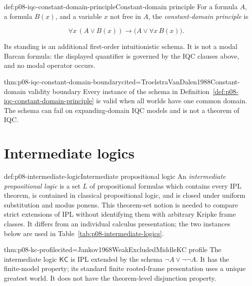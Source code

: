 \begin{hbdefinition}{def:p08-iqc-constant-domain-principle}{Constant-domain principle}
For a formula \(A\), a formula \(B(x)\), and a variable \(x\) not free in
\(A\), the \emph{constant-domain principle} is

\[
  \forall x\,(A\lor B(x))\to
  \bigl(A\lor\forall x\,B(x)\bigr).
\]

Its standing is an additional first-order intuitionistic schema.  It is not a
modal Barcan formula: the displayed quantifier is governed by the IQC clauses
above, and no modal operator occurs.
\end{hbdefinition}

\begin{hbtheorem}{thm:p08-iqc-constant-domain-boundary}{cited=TroelstraVanDalen1988}{Constant-domain validity boundary}
Every instance of the schema in
Definition~\ref{def:p08-iqc-constant-domain-principle} is valid when all
worlds have one common domain.  The schema can fail on expanding-domain IQC
models and is not a theorem of IQC.
\end{hbtheorem}

\section{Intermediate logics}

\begin{hbdefinition}{def:p08-intermediate-logic}{Intermediate propositional logic}
An \emph{intermediate propositional logic} is a set \(L\) of propositional
formulas which contains every IPL theorem, is contained in classical
propositional logic, and is closed under uniform substitution and modus
ponens.  This theorem-set notion is needed to compare strict extensions of
IPL without identifying them with arbitrary Kripke frame classes.  It differs
from an individual calculus presentation; the two instances below are used in
Table~\ref{tab:p08-intermediate-logics}.
\end{hbdefinition}

\begin{hbtheorem}{thm:p08-kc-profile}{cited=Jankov1968WeakExcludedMiddle}{KC profile}
The intermediate logic \(\mathsf{KC}\) is IPL extended by the schema
\(\neg A\lor\neg\neg A\).  It has the finite-model property; its standard
finite rooted-frame presentation uses a unique greatest world.  It does not
have the theorem-level disjunction property.
\end{hbtheorem}

